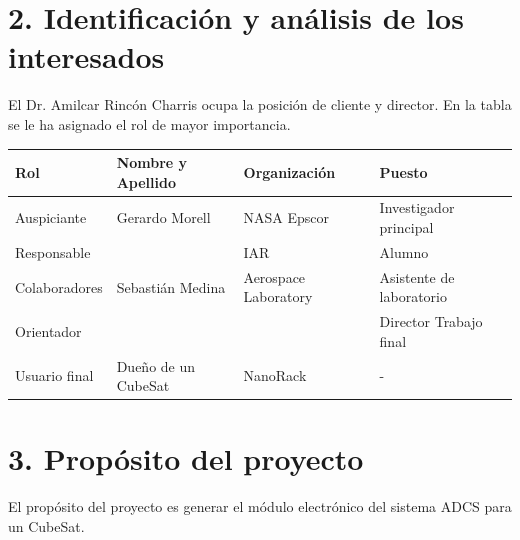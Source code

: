 \documentclass[
11pt, %
]{charter}
\begin{document}
\section{2. Identificación y análisis de los interesados}
\label{sec:interesados}
	El Dr. Amilcar Rincón Charris ocupa la posición de cliente y director. En la tabla se le ha asignado el rol de mayor importancia.


\begin{table}[ht]
	\begin{tabularx}{\linewidth}{@{}|l|X|X|l|@{}}
		\hline
		\rowcolor[HTML]{C0C0C0} 
		Rol           & Nombre y Apellido & Organización 	& Puesto 	\\ \hline
		Auspiciante   &  Gerardo Morell    & NASA Epscor             	& Investigador principal  \\ \hline		
		Responsable   & \authorname       & IAR        	& Alumno 	\\ \hline
		Colaboradores & Sebastián Medina                   &  Aerospace Laboratory        	& Asistente de laboratorio       	\\ \hline
		Orientador    & \supname	      & \pertesupname 	& Director Trabajo final \\ \hline
		Usuario final & Dueño de un CubeSat     &      NanoRack        	&      -   	\\ \hline
	\end{tabularx}
\end{table}


\section{3. Propósito del proyecto}

	El propósito del proyecto es generar el módulo electrónico del sistema ADCS para un CubeSat. 
\end{document}
